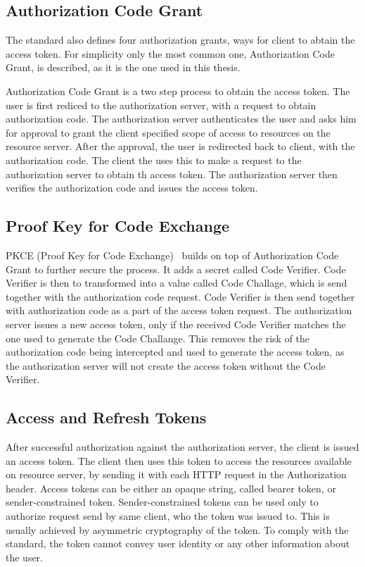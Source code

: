 \subsection*{Authorization Code Grant}
The standard also defines four authorization grants, ways for client to abtain the access token. For simplicity only the most common one, Authorization Code Grant, is described, as it is the one used in this thesis.

Authorization Code Grant is a two step process to obtain the access token. The user is first rediced to the authorization server, with a request to obtain authorization code. The authorization server authenticates the user and asks him for approval to grant the client specified scope of access to resources on the resource server. After the approval, the user is redirected back to client, with the authorization code. The client the uses this to make a request to the authorization server to obtain th access token. The authorization server then verifies the authorization code and issues the access token.


\subsection*{Proof Key for Code Exchange}
PKCE (Proof Key for Code Exchange) \cite{pkce_rfc} builds on top of Authorization Code Grant to further secure the process. It adds a secret called Code Verifier. Code Verifier is then to transformed into a value called Code Challage, which is send together with the authorization code request. Code Verifier is then send together with authorization code as a part of the access token request. The authorization server issues a new access token, only if the received Code Verifier matches the one used to generate the Code Challange. This removes the risk of the authorization code being intercepted and used to generate the access token, as the authorization server will not create the access token without the Code Verifier.


\subsection*{Access and Refresh Tokens}
After successful authorization against the authorization server, the client is issued an access token. The client then uses this token to access the resources available on resource server, by sending it with each HTTP request in the Authorization header. Access tokens can be either an opaque string, called bearer token, or sender-constrained token. Sender-constrained tokens can be used only to authorize request send by same client, who the token was issued to. This is usually achieved by asymmetric cryptography of the token. To comply with the standard, the token cannot convey user identity or any other information about the user.


